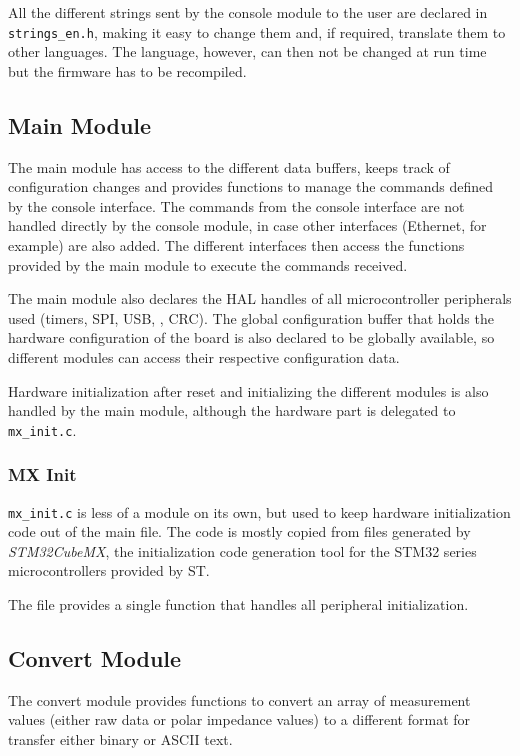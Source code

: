 All the different strings sent by the console module to the user are declared in \verb!strings_en.h!, making it easy
to change them and, if required, translate them to other languages. The language, however, can then not be changed
at run time but the firmware has to be recompiled.


\subsection{Main Module}

The main module has access to the different data buffers, keeps track of configuration changes and provides functions
to manage the commands defined by the console interface. The commands from the console interface are not handled
directly by the console module, in case other interfaces (Ethernet, for example) are also added. The different
interfaces then access the functions provided by the main module to execute the commands received.

The main module also declares the HAL handles of all microcontroller peripherals used (timers, SPI, USB, \iic{}, CRC).
The global configuration buffer that holds the hardware configuration of the board is also declared to be globally
available, so different modules can access their respective configuration data.

Hardware initialization after reset and initializing the different modules is also handled by the main module, although
the hardware part is delegated to \verb!mx_init.c!.

\subsubsection{MX Init}

\verb!mx_init.c! is less of a module on its own, but used to keep hardware initialization code out of the main file.
The code is mostly copied from files generated by \emph{STM32CubeMX}, the initialization code generation tool for the
STM32 series microcontrollers provided by ST.

The file provides a single function that handles all peripheral initialization.


\subsection{Convert Module}

The convert module provides functions to convert an array of measurement values (either raw data or polar
impedance values) to a different format for transfer either binary or ASCII text.

